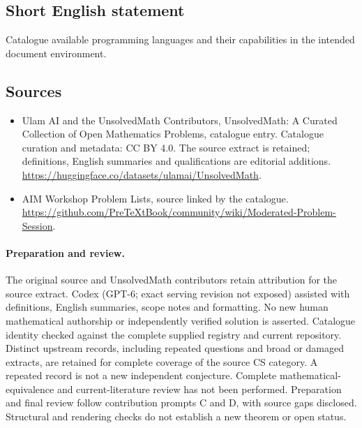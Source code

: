 \documentclass[11pt]{article}
\begin{document}
\subsection{Short English statement}
Catalogue available programming languages and their capabilities in the intended document environment.
\subsection{Sources}
\begin{itemize}
\item[\hypertarget{source:statement:1}{S1}] Ulam AI and the UnsolvedMath Contributors, UnsolvedMath: A Curated Collection of Open Mathematics Problems, catalogue entry. Catalogue curation and metadata: CC BY 4.0. The source extract is retained; definitions, English summaries and qualifications are editorial additions.
\url{https://huggingface.co/datasets/ulamai/UnsolvedMath}.
\item[\hypertarget{source:statement:2}{S2}] AIM Workshop Problem Lists, source linked by the catalogue.
\url{https://github.com/PreTeXtBook/community/wiki/Moderated-Problem-Session}.
\end{itemize}
\paragraph{Preparation and review.}
The original source and UnsolvedMath contributors retain attribution for the source extract. Codex (GPT-6; exact serving revision not exposed) assisted with definitions, English summaries, scope notes and formatting. No new human mathematical authorship or independently verified solution is asserted. Catalogue identity checked against the complete supplied registry and current repository. Distinct upstream records, including repeated questions and broad or damaged extracts, are retained for complete coverage of the source CS category. A repeated record is not a new independent conjecture. Complete mathematical-equivalence and current-literature review has not been performed. Preparation and final review follow contribution prompts C and D, with source gaps disclosed. Structural and rendering checks do not establish a new theorem or open status.
\label{end:statement}
\end{document}
